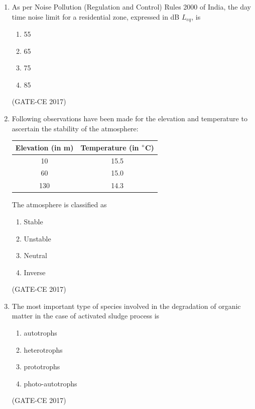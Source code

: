 \documentclass[journal,12pt,onecolumn]{article}
\theoremstyle{remark}
\begin{document}
\begin{enumerate}
    \item As per Noise Pollution (Regulation and Control) Rules 2000 of India, the day time noise limit for a residential zone, expressed in dB $L_{eq}$, is
    \begin{multicols}{4}
    \begin{enumerate}
        \item 55  
        \item 65  
        \item 75  
        \item 85  
    \end{enumerate}
    \end{multicols}
    \hfill (GATE-CE 2017)

    \item Following observations have been made for the elevation and temperature to ascertain the stability of the atmosphere:
    \begin{table}[H]
    \centering
    \begin{tabular}{|c|c|}
    \hline
    Elevation (in m) & Temperature (in $\degree$C) \\
    \hline
    10 & 15.5 \\
    60 & 15.0 \\
    130 & 14.3 \\
    \hline
    \end{tabular}
    \end{table}
    The atmosphere is classified as
    \begin{multicols}{4}
    \begin{enumerate}
        \item Stable  
        \item Unstable  
        \item Neutral  
        \item Inverse  
    \end{enumerate}
    \end{multicols}
    \hfill (GATE-CE 2017)

    \item The most important type of species involved in the degradation of organic matter in the case of activated sludge process is
    \begin{multicols}{2}
    \begin{enumerate}
        \item autotrophs  
        \item heterotrophs  
        \item prototrophs  
        \item photo-autotrophs  
    \end{enumerate}
    \end{multicols}
    \hfill (GATE-CE 2017)


\end{enumerate}
\end{document}
